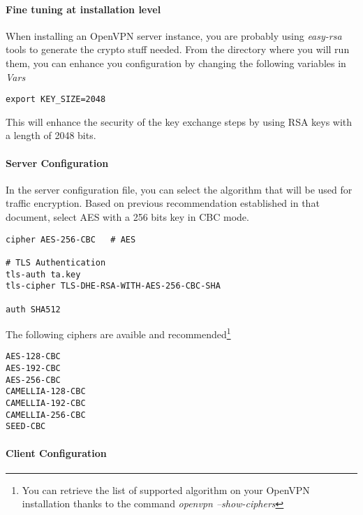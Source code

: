 \paragraph{Fine tuning at installation level}

When installing an OpenVPN server instance, you are probably using {\it easy-rsa} tools to generate the crypto stuff needed.
From the directory where you will run them, you can enhance you configuration by changing the following variables in {\it Vars}

\begin{lstlisting}[breaklines]
export KEY_SIZE=2048 
\end{lstlisting}

This will enhance the security of the key exchange steps by using RSA keys with a length of 2048 bits.

\paragraph{Server Configuration}

In the server configuration file, you can select the algorithm that will be used for traffic encryption.
Based on previous recommendation established in that document, select AES with a 256 bits key in CBC mode.

\begin{lstlisting}[breaklines]
cipher AES-256-CBC   # AES

# TLS Authentication
tls-auth ta.key
tls-cipher TLS-DHE-RSA-WITH-AES-256-CBC-SHA

auth SHA512
\end{lstlisting}


The following ciphers are avaible and recommended\footnote{You can retrieve the list of supported algorithm on your OpenVPN installation thanks to the command {\it openvpn --show-ciphers}}
\begin{lstlisting}[breaklines]
AES-128-CBC
AES-192-CBC
AES-256-CBC
CAMELLIA-128-CBC
CAMELLIA-192-CBC
CAMELLIA-256-CBC
SEED-CBC
\end{lstlisting}

\paragraph{Client Configuration}

